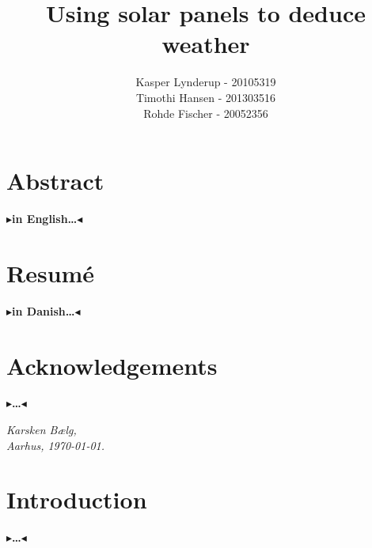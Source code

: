 \documentclass[a4paper]{article}
\makeatletter
\newcommand\csAdvisor[1]{\renewcommand\@csAdvisor{#1}}
\newcommand\@csAdvisor{\@latex@error{No \noexpand\csAdvisor given}\@ehc}
\newcommand{\todo}[1]{{\color[rgb]{.5,0,0}\textbf{$\blacktriangleright$#1$\blacktriangleleft$}}}
\makeatother
\begin{document}
\author{Kasper Lynderup - 20105319\\Timothi Hansen - 201303516\\Rohde Fischer - 20052356}
\csAdvisor{Niels Olof Bouvin}
\title{Using solar panels to deduce weather}
\pagestyle{empty}
\maketitle


\pagestyle{plain}
\setcounter{page}{1}
\chapter*{Abstract}

\todo{in English\dots}

\chapter*{Resum\'e}

\todo{in Danish\dots}

\chapter*{Acknowledgements}

\todo{\dots}

\vspace{2ex}
\begin{flushright}
  \emph{Karsken Bælg,}\\
  \emph{Aarhus, \today.}
\end{flushright}

\tableofcontents
{}
\setcounter{secnumdepth}{2}


\chapter{Introduction}
\label{ch:intro}

\todo{\dots}

\end{document}
